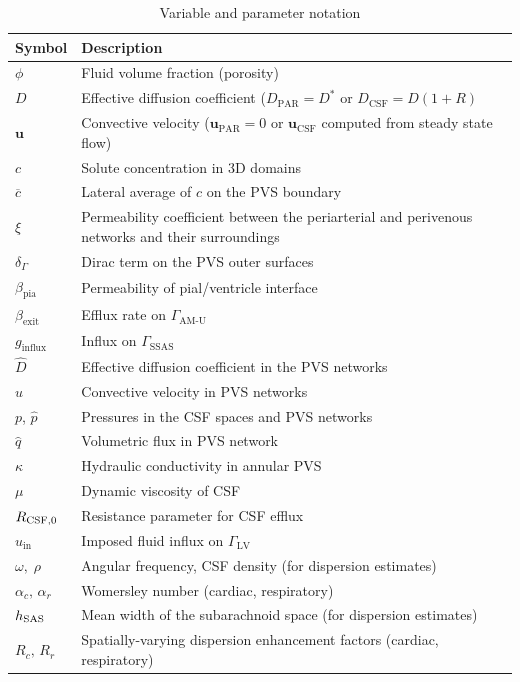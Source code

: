 \documentclass[fleqn,10pt]{wlscirep}
\begin{document}
\begin{table}[htb!]
\centering 
\begin{tabular}{ll}
\toprule
\textbf{Symbol} & \textbf{Description} \\
\midrule
$\phi$ & Fluid volume fraction (porosity) \\
$D$ & Effective diffusion coefficient ($D_{\mathrm{PAR}} = D^*$ or $D_{\mathrm{CSF}} = D(1+R)$ \\
$\bm u$ & Convective velocity (${\bm u}_{\mathrm{PAR}} = 0$ or ${\bm u}_{\mathrm{CSF}}$ computed from steady state flow) \\
$c$ & Solute concentration in 3D domains \\
$\overline{c}$ & Lateral average of $c$ on the PVS boundary \\
$\xi$ & Permeability coefficient between the periarterial and perivenous networks
and their surroundings\\
$\delta_{\Gamma}$ & Dirac term on the PVS outer surfaces \\
$\beta_{\mathrm{pia}}$ & Permeability of pial/ventricle interface \\
$\beta_{\mathrm{exit}}$ & Efflux rate on $\Gamma_{\mathrm{AM\text{-}U}}$ \\
$g_{\mathrm{influx}}$ & Influx on $\Gamma_{\mathrm{SSAS}}$ \\
$\hat D$ & Effective diffusion coefficient in the PVS networks \\
$\hat u$ & Convective velocity in PVS networks \\
$p$, $\hat{p}$ & Pressures in the CSF spaces and PVS networks \\
$\hat{q}$ & Volumetric flux in PVS network \\
$\kappa$ & Hydraulic conductivity in annular PVS \\
$\mu$ & Dynamic viscosity of CSF \\
$R_{\rm CSF, 0}$ & Resistance parameter for CSF efflux \\
$u_{\mathrm{in}}$ & Imposed fluid influx on $\Gamma_{\mathrm{LV}}$ \\
$\omega,\;\rho$ & Angular frequency, CSF density (for dispersion estimates) \\
$\alpha_c,\, \alpha_r$ & Womersley number (cardiac, respiratory) \\
$h_{\rm SAS}$ & Mean width of the subarachnoid space (for dispersion estimates) \\
$R_c,\,R_r$ & Spatially-varying dispersion enhancement factors (cardiac, respiratory) \\
\bottomrule
\end{tabular}
\caption{Variable and parameter notation}
\label{table:variable}
\end{table}
\end{document}
